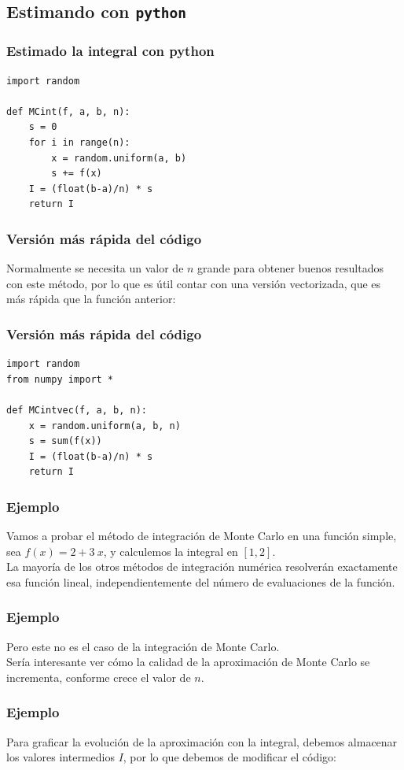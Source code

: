 \subsection{Estimando con \texttt{python}}
\begin{frame}
\frametitle{Estimado la integral con python}
\begin{lstlisting}[caption=Función para aproximar la integral, style=codigopython]
import random

def MCint(f, a, b, n):
    s = 0
    for i in range(n):
        x = random.uniform(a, b)
        s += f(x)
    I = (float(b-a)/n) * s
    return I
\end{lstlisting}
\end{frame}
\begin{frame}[fragile]
\frametitle{Versión más rápida del código}
Normalmente se necesita un valor de $n$ grande para obtener buenos resultados con este método, por lo que es útil contar con una versión vectorizada, que es más rápida que la función anterior:
\end{frame}
\begin{frame}
\frametitle{Versión más rápida del código}
\begin{lstlisting}[caption=Función vectorizada para la aproximación de la integral, style=codigopython]
import random
from numpy import *

def MCintvec(f, a, b, n):
    x = random.uniform(a, b, n)
    s = sum(f(x))
    I = (float(b-a)/n) * s
    return I
\end{lstlisting}
\end{frame}
\begin{frame}
\frametitle{Ejemplo}
Vamos a probar el método de integración de Monte Carlo en una función simple, sea $f(x) = 2 + 3 \: x$, y calculemos la integral en $[1, 2]$.
\\
\bigskip
La mayoría de los otros métodos de integración numérica resolverán exactamente esa función lineal, independientemente del número de evaluaciones de la función.
\end{frame}
\begin{frame}
\frametitle{Ejemplo}
Pero este no es el caso de la integración de Monte Carlo. 
\\
\bigskip
Sería interesante ver cómo la calidad de la aproximación de Monte Carlo se incrementa, conforme crece el valor de $n$.
\end{frame}
\begin{frame}
\frametitle{Ejemplo}
Para graficar la evolución de la aproximación con la integral, debemos almacenar los valores intermedios $I$, por lo que debemos de modificar el código:
\end{frame}
